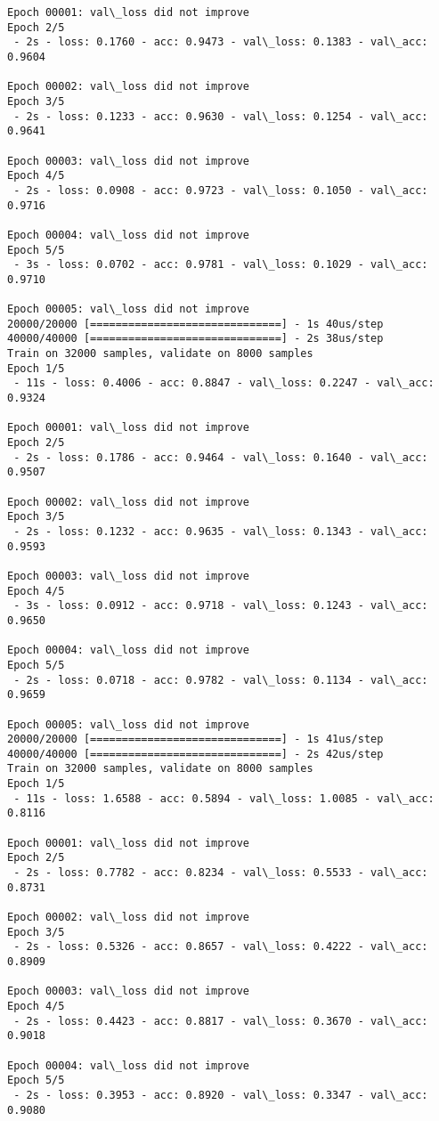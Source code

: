 \documentclass[11pt]{article}
\begin{document}
\begin{Verbatim}[commandchars=\\\{\}]
Epoch 00001: val\_loss did not improve
Epoch 2/5
 - 2s - loss: 0.1760 - acc: 0.9473 - val\_loss: 0.1383 - val\_acc: 0.9604

Epoch 00002: val\_loss did not improve
Epoch 3/5
 - 2s - loss: 0.1233 - acc: 0.9630 - val\_loss: 0.1254 - val\_acc: 0.9641

Epoch 00003: val\_loss did not improve
Epoch 4/5
 - 2s - loss: 0.0908 - acc: 0.9723 - val\_loss: 0.1050 - val\_acc: 0.9716

Epoch 00004: val\_loss did not improve
Epoch 5/5
 - 3s - loss: 0.0702 - acc: 0.9781 - val\_loss: 0.1029 - val\_acc: 0.9710

Epoch 00005: val\_loss did not improve
20000/20000 [==============================] - 1s 40us/step
40000/40000 [==============================] - 2s 38us/step
Train on 32000 samples, validate on 8000 samples
Epoch 1/5
 - 11s - loss: 0.4006 - acc: 0.8847 - val\_loss: 0.2247 - val\_acc: 0.9324

Epoch 00001: val\_loss did not improve
Epoch 2/5
 - 2s - loss: 0.1786 - acc: 0.9464 - val\_loss: 0.1640 - val\_acc: 0.9507

Epoch 00002: val\_loss did not improve
Epoch 3/5
 - 2s - loss: 0.1232 - acc: 0.9635 - val\_loss: 0.1343 - val\_acc: 0.9593

Epoch 00003: val\_loss did not improve
Epoch 4/5
 - 3s - loss: 0.0912 - acc: 0.9718 - val\_loss: 0.1243 - val\_acc: 0.9650

Epoch 00004: val\_loss did not improve
Epoch 5/5
 - 2s - loss: 0.0718 - acc: 0.9782 - val\_loss: 0.1134 - val\_acc: 0.9659

Epoch 00005: val\_loss did not improve
20000/20000 [==============================] - 1s 41us/step
40000/40000 [==============================] - 2s 42us/step
Train on 32000 samples, validate on 8000 samples
Epoch 1/5
 - 11s - loss: 1.6588 - acc: 0.5894 - val\_loss: 1.0085 - val\_acc: 0.8116

Epoch 00001: val\_loss did not improve
Epoch 2/5
 - 2s - loss: 0.7782 - acc: 0.8234 - val\_loss: 0.5533 - val\_acc: 0.8731

Epoch 00002: val\_loss did not improve
Epoch 3/5
 - 2s - loss: 0.5326 - acc: 0.8657 - val\_loss: 0.4222 - val\_acc: 0.8909

Epoch 00003: val\_loss did not improve
Epoch 4/5
 - 2s - loss: 0.4423 - acc: 0.8817 - val\_loss: 0.3670 - val\_acc: 0.9018

Epoch 00004: val\_loss did not improve
Epoch 5/5
 - 2s - loss: 0.3953 - acc: 0.8920 - val\_loss: 0.3347 - val\_acc: 0.9080


\end{Verbatim}
\end{document}
